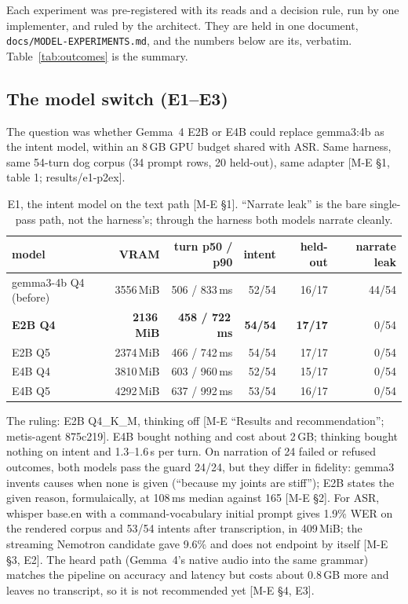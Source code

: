 \documentclass[11pt]{article}
\newcommand{\src}[1]{{\footnotesize\textsf{[#1]}}}
\begin{document}
Each experiment was pre-registered with its reads and a decision rule, run by one
implementer, and ruled by the architect. They are held in one document,
\texttt{docs/MODEL-EXPERIMENTS.md}, and the numbers below are its, verbatim.
Table~\ref{tab:outcomes} is the summary.

\subsection{The model switch (E1--E3)}\label{sec:e1}

The question was whether Gemma~4 E2B or E4B could replace gemma3:4b as the intent model,
within an 8\,GB GPU budget shared with ASR. Same harness, same 54-turn dog corpus (34 prompt
rows, 20 held-out), same adapter \src{M-E \S1, table 1; results/e1-p2ex}.

\begin{table}[h]
\centering\small
\begin{tabular}{@{}lrrrrr@{}}
\toprule
model & VRAM & turn p50 / p90 & intent & held-out & narrate leak \\
\midrule
gemma3-4b Q4 (before) & 3556\,MiB & 506 / 833\,ms & 52/54 & 16/17 & 44/54 \\
\textbf{E2B Q4} & \textbf{2136\,MiB} & \textbf{458 / 722\,ms} & \textbf{54/54} & \textbf{17/17} & 0/54 \\
E2B Q5 & 2374\,MiB & 466 / 742\,ms & 54/54 & 17/17 & 0/54 \\
E4B Q4 & 3810\,MiB & 603 / 960\,ms & 52/54 & 15/17 & 0/54 \\
E4B Q5 & 4292\,MiB & 637 / 992\,ms & 53/54 & 16/17 & 0/54 \\
\bottomrule
\end{tabular}
\caption{E1, the intent model on the text path \src{M-E \S1}. ``Narrate leak'' is the bare
single-pass path, not the harness's; through the harness both models narrate cleanly.}
\label{tab:e1}
\end{table}

The ruling: E2B Q4\_K\_M, thinking off \src{M-E ``Results and recommendation'';
metis-agent 875c219}. E4B bought nothing and cost about 2\,GB; thinking bought nothing on
intent and 1.3--1.6\,s per turn. On narration of 24 failed or refused outcomes, both models
pass the guard 24/24, but they differ in fidelity: gemma3 invents causes when none is
given (``because my joints are stiff''); E2B states the given reason, formulaically, at
108\,ms median against 165 \src{M-E \S2}. For ASR, whisper base.en with a command-vocabulary
initial prompt gives 1.9\% WER on the rendered corpus and 53/54 intents after transcription,
in 409\,MiB; the streaming Nemotron candidate gave 9.6\% and does not endpoint by itself
\src{M-E \S3, E2}. The heard path (Gemma~4's native audio into the same grammar) matches
the pipeline on accuracy and latency but costs about 0.8\,GB more and leaves no transcript,
so it is not recommended yet \src{M-E \S4, E3}.
\end{document}
